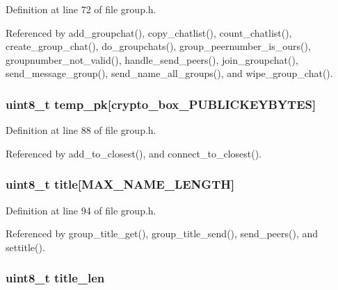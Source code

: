 Definition at line 72 of file group.\+h.



Referenced by add\+\_\+groupchat(), copy\+\_\+chatlist(), count\+\_\+chatlist(), create\+\_\+group\+\_\+chat(), do\+\_\+groupchats(), group\+\_\+peernumber\+\_\+is\+\_\+ours(), groupnumber\+\_\+not\+\_\+valid(), handle\+\_\+send\+\_\+peers(), join\+\_\+groupchat(), send\+\_\+message\+\_\+group(), send\+\_\+name\+\_\+all\+\_\+groups(), and wipe\+\_\+group\+\_\+chat().

\hypertarget{struct_group__c_a46affbcc202b25e96fd1f5238e9e97e0}{
\subsubsection[{temp\+\_\+pk}]{\setlength{\rightskip}{0pt plus 5cm}uint8\+\_\+t temp\+\_\+pk\mbox{[}crypto\+\_\+box\+\_\+\+P\+U\+B\+L\+I\+C\+K\+E\+Y\+B\+Y\+T\+E\+S\mbox{]}}}\label{struct_group__c_a46affbcc202b25e96fd1f5238e9e97e0}


Definition at line 88 of file group.\+h.



Referenced by add\+\_\+to\+\_\+closest(), and connect\+\_\+to\+\_\+closest().

\hypertarget{struct_group__c_a9ace0499016685340a1f3009a7aa01e0}{
\subsubsection[{title}]{\setlength{\rightskip}{0pt plus 5cm}uint8\+\_\+t title\mbox{[}{\bf M\+A\+X\+\_\+\+N\+A\+M\+E\+\_\+\+L\+E\+N\+G\+T\+H}\mbox{]}}}\label{struct_group__c_a9ace0499016685340a1f3009a7aa01e0}


Definition at line 94 of file group.\+h.



Referenced by group\+\_\+title\+\_\+get(), group\+\_\+title\+\_\+send(), send\+\_\+peers(), and settitle().

\hypertarget{struct_group__c_ac32d4f2bb9021dfa0b7ce5f9537412d7}{
\subsubsection[{title\+\_\+len}]{\setlength{\rightskip}{0pt plus 5cm}uint8\+\_\+t title\+\_\+len}}\label{struct_group__c_ac32d4f2bb9021dfa0b7ce5f9537412d7}


